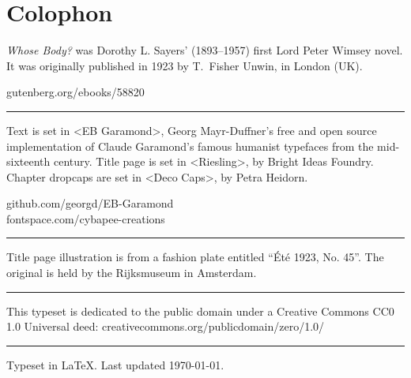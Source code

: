 \documentclass[
a5paper
]{scrbook}
\begin{document}
\chapter*{Colophon}
\begin{center}
\begin{minipage}{\textwidth}
\textit{Whose Body?} was Dorothy L. Sayers' (1893--1957) first Lord Peter Wimsey novel. It was originally published in 1923 by T.~Fisher Unwin, in London (UK).
\end{minipage}
\vfill
gutenberg.org/ebooks/58820
\vfill
\rule{0.5\textwidth}{.4pt}
\vfill
\begin{minipage}{\textwidth}
Text is set in <EB Garamond>, Georg Mayr-Duffner's free and open source implementation of Claude Garamond’s famous humanist typefaces from the mid-sixteenth century. Title page is set in <Riesling>, by Bright Ideas Foundry. Chapter dropcaps are set in <Deco Caps>, by Petra Heidorn.
\end{minipage}
\vfill
github.com/georgd/EB-Garamond\\fontspace.com/cybapee-creations
\vfill
\rule{0.5\textwidth}{.4pt}
\vfill
\begin{minipage}{\textwidth}
Title page illustration is from a fashion plate entitled \foreignquote{french}{Été 1923, No. 45}. The original is held by the Rijksmuseum in Amsterdam.
\end{minipage}
\vfill
\rule{0.5\textwidth}{.4pt}
\vfill
\begin{minipage}{\textwidth}
This typeset is dedicated to the public domain under a Creative Commons CC0 1.0 Universal deed: creativecommons.org/publicdomain/zero/1.0/
\end{minipage}
\vfill
\rule{0.5\textwidth}{.4pt}
\vfill
Typeset in \LaTeX{}. Last updated \today.
\end{center}
\thispagestyle{empty}
\end{document}
